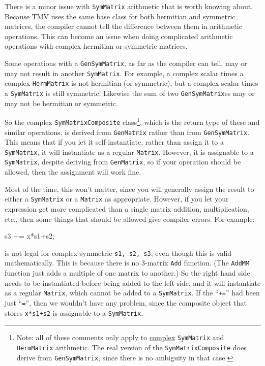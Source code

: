 \documentclass[twoside,letterpaper,11pt]{article}
\renewcommand{\tt}[1]{{\lstinline {#1}}}
\begin{document}
There is a minor issue with \tt{SymMatrix} arithmetic that is
worth knowing about.
Because TMV uses the same base class for both hermitian and symmetric
matrices, the compiler cannot tell the difference between them in arithmetic
operations.  
This can become an issue when doing complicated arithmetic operations
with complex hermitian or symmetric matrices.

Some operations with a \tt{GenSymMatrix}, as far as the compiler can tell, may or may
not result in another \tt{SymMatrix}.  For example, a complex scalar times a complex 
\tt{HermMatrix} is not hermitian (or symmetric), but a complex scalar times a \tt{SymMatrix}
is still symmetric.
Likewise the sum of two \tt{GenSymMatrix}es may or may not be hermitian or symmetric.

So the complex \tt{SymMatrixComposite} class\footnote{
Note: all of these comments only apply to \underline{complex} \tt{SymMatrix} and \tt{HermMatrix}
arithmetic.  The real version of the \tt{SymMatrixComposite} does derive from
\tt{GenSymMatrix}, since there is no ambiguity in that case.},
which is the return type of these and similar operations, 
is derived from \tt{GenMatrix}
rather than from \tt{GenSymMatrix}.  This means that if you let it
self-instantiate, rather than assign it to a \tt{SymMatrix}, it will 
instantiate as a regular \tt{Matrix}.  However, it is assignable to a \tt{SymMatrix},
despite deriving from \tt{GenMatrix},
so if your operation should be allowed, then the assignment will work fine.

Most of the time, this won't matter, since
you will generally assign the result to either a \tt{SymMatrix} or a \tt{Matrix}
as appropriate.  However, if you let your expression get more complicated than a single
matrix addition, multiplication, etc., then some things that should be allowed give compiler errors.
For example:
\begin{tmvcode}
s3 += x*s1+s2;
\end{tmvcode}
is not legal for complex symmetric \tt{s1, s2, s3}, even though this is valid mathematically.
This is because there is no 3-matrix 
\tt{Add} function.  (The \tt{AddMM} function just adds a multiple of one 
matrix to another.)  So the right hand side needs to be instantiated before
being added to the left side, and it will instantiate as a regular \tt{Matrix},
which cannot be added to a \tt{SymMatrix}.  
If the ``\tt{+=}'' had been just ``\tt{=}'', then we wouldn't have any problem,
since the composite object that stores \tt{x*s1+s2} is assignable to a \tt{SymMatrix}.
\end{document}
